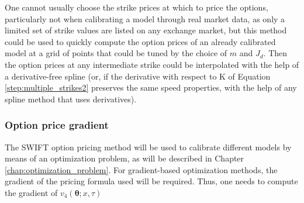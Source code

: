\documentclass[12,twoside]{mammeTFM}
\theoremstyle{definition}
\theoremstyle{remark}
\begin{document}
\begin{itemize}
One cannot usually choose the strike prices at which to price the options, particularly not when calibrating a model through real market data, as only a limited set of strike values are listed on any exchange market, but this method could be used to quickly compute the option prices of an already calibrated model at a grid of points that could be tuned by the choice of $m$ and $J_d$. Then the option prices at any intermediate strike could be interpolated with the help of a derivative-free spline (or, if the derivative with respect to K of Equation \ref{step:multiple_strikes2} preserves the same speed properties, with the help of any spline method that uses derivatives).
\end{itemize}

\subsubsection{Option price gradient}\label{subsec:gradient}

The SWIFT option pricing method will be used to calibrate different models by means of an optimization problem, as will be described in Chapter \ref{chap:optimization_problem}. For gradient-based optimization methods, the gradient of the pricing formula used will be required. Thus, one needs to compute the gradient of $v_4(\boldsymbol{\theta}; x, \tau)$
\end{document}
